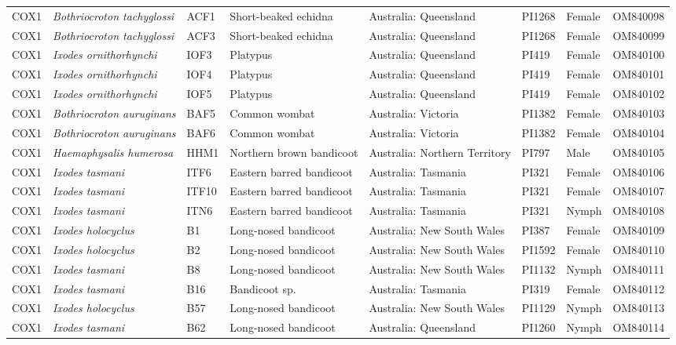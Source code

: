 \documentclass[a4paper, nobind]{templates/ociamthesis}
\begin{document}
\begin{landscape}
\begin{longtable}[t]{l>{}lllllll}
\endfoot
\bottomrule
\endlastfoot
COX1 & \em{Bothriocroton tachyglossi} & ACF1 & Short-beaked echidna & Australia: Queensland & PI1268 & Female & OM840098\\
COX1 & \em{Bothriocroton tachyglossi} & ACF3 & Short-beaked echidna & Australia: Queensland & PI1268 & Female & OM840099\\
COX1 & \em{Ixodes ornithorhynchi} & IOF3 & Platypus & Australia: Queensland & PI419 & Female & OM840100\\
COX1 & \em{Ixodes ornithorhynchi} & IOF4 & Platypus & Australia: Queensland & PI419 & Female & OM840101\\
COX1 & \em{Ixodes ornithorhynchi} & IOF5 & Platypus & Australia: Queensland & PI419 & Female & OM840102\\
COX1 & \em{Bothriocroton auruginans} & BAF5 & Common wombat & Australia: Victoria & PI1382 & Female & OM840103\\
COX1 & \em{Bothriocroton auruginans} & BAF6 & Common wombat & Australia: Victoria & PI1382 & Female & OM840104\\
COX1 & \em{Haemaphysalis humerosa} & HHM1 & Northern brown bandicoot & Australia: Northern Territory & PI797 & Male & OM840105\\
COX1 & \em{Ixodes tasmani} & ITF6 & Eastern barred bandicoot & Australia: Tasmania & PI321 & Female & OM840106\\
COX1 & \em{Ixodes tasmani} & ITF10 & Eastern barred bandicoot & Australia: Tasmania & PI321 & Female & OM840107\\
COX1 & \em{Ixodes tasmani} & ITN6 & Eastern barred bandicoot & Australia: Tasmania & PI321 & Nymph & OM840108\\
COX1 & \em{Ixodes holocyclus} & B1 & Long-nosed bandicoot & Australia: New South Wales & PI387 & Female & OM840109\\
COX1 & \em{Ixodes holocyclus} & B2 & Long-nosed bandicoot & Australia: New South Wales & PI1592 & Female & OM840110\\
COX1 & \em{Ixodes tasmani} & B8 & Long-nosed bandicoot & Australia: New South Wales & PI1132 & Nymph & OM840111\\
COX1 & \em{Ixodes tasmani} & B16 & Bandicoot sp. & Australia: Tasmania & PI319 & Female & OM840112\\
COX1 & \em{Ixodes holocyclus} & B57 & Long-nosed bandicoot & Australia: New South Wales & PI1129 & Nymph & OM840113\\
COX1 & \em{Ixodes tasmani} & B62 & Long-nosed bandicoot & Australia: Queensland & PI1260 & Nymph & OM840114\\

\end{longtable}
\end{landscape}
\end{document}
